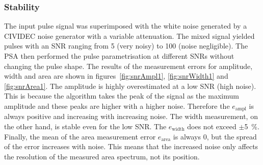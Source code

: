 \subsubsection{Stability}
The input pulse signal was superimposed with the white noise generated by a CIVIDEC noise generator with a variable attenuation. The mixed signal yielded pulses with an SNR ranging from 5 (very noisy) to 100 (noise negligible). The PSA then performed the pulse parametrisation at different SNRs without changing the pulse shape. The results of the measurement errors for amplitude, width and area are shown in figures~\ref{fig:snrAmpl1}, \ref{fig:snrWidth1} and \ref{fig:snrArea1}. The amplitude is highly overestimated at a low SNR (high noise). This is because the algorithm takes the peak of the signal as the maximum amplitude and these peaks are higher with a higher noise. Therefore the $e_\mathrm{ampl}$ is always positive and increasing with increasing noise. The width measurement, on the other hand, is stable even for the low SNR. The $e_\mathrm{width}$ does not exceed $\pm$5~\%. Finally, the mean of the area measurement error $e_\mathrm{area}$ is always 0, but the spread of the error increases with noise. This means that the increased noise only affects the resolution of the measured area spectrum, not its position.

